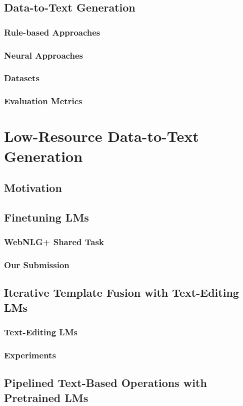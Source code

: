 \documentclass[12pt,notitlepage,a4paper,openright]{report}
\begin{document}
\section{Data-to-Text Generation}
\subsection{Rule-based Approaches}
\subsection{Neural Approaches}
\subsection{Datasets}
\subsection{Evaluation Metrics}

\chapter{Low-Resource Data-to-Text Generation}
\section{Motivation}
\section{Finetuning LMs}
\subsection{WebNLG+ Shared Task}
\subsection{Our Submission}
\section{Iterative Template Fusion with Text-Editing LMs}
\subsection{Text-Editing LMs}
\subsection{Experiments}
\section{Pipelined Text-Based Operations with Pretrained LMs}
\end{document}
